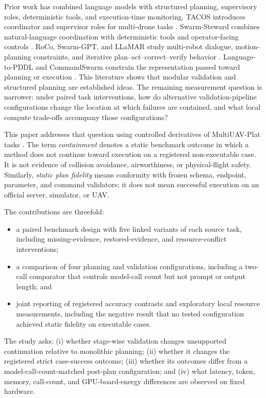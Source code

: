 \documentclass[conference]{IEEEtran}
\begin{document}
Prior work has combined language models with structured planning, supervisory
roles, deterministic tools, and execution-time monitoring. TACOS introduces
coordinator and supervisor roles for multi-drone tasks \cite{tacos}.
Swarm-Steward combines natural-language coordination with deterministic tools
and operator-facing controls \cite{swarm_steward}. RoCo, Swarm-GPT, and LLaMAR
study multi-robot dialogue, motion-planning constraints, and iterative
plan--act--correct--verify behavior \cite{roco,swarm_gpt,llamar}.
Language-to-PDDL and CommandSwarm constrain the representation passed toward
planning or execution \cite{language_pddl,commandswarm}. This literature shows
that modular validation and structured planning are established ideas. The
remaining measurement question is narrower: under paired task interventions,
how do alternative validation-pipeline configurations change the location at
which failures are contained, and what local compute trade-offs accompany
those configurations?

This paper addresses that question using controlled derivatives of
MultiUAV-Plat tasks \cite{multiuav_plat}. The term \emph{containment} denotes a
static benchmark outcome in which a method does not continue toward execution
on a registered non-executable case. It is not evidence of collision avoidance,
airworthiness, or physical-flight safety. Similarly, \emph{static plan
fidelity} means conformity with frozen schema, endpoint, parameter, and command
validators; it does not mean successful execution on an official server,
simulator, or UAV.

The contributions are threefold:
\begin{itemize}
  \item a paired benchmark design with five linked variants of each source task,
        including missing-evidence, restored-evidence, and resource-conflict
        interventions;
  \item a comparison of four planning and validation configurations, including
        a two-call comparator that controls model-call count but not prompt or
        output length; and
  \item joint reporting of registered accuracy contrasts and exploratory local
        resource measurements, including the negative result that no tested
        configuration achieved static fidelity on executable cases.
\end{itemize}

The study asks: (i) whether stage-wise validation changes unsupported
continuation relative to monolithic planning; (ii) whether it changes the
registered strict case-success outcome; (iii) whether its outcomes differ from
a model-call-count-matched post-plan configuration; and (iv) what latency,
token, memory, call-count, and GPU-board-energy differences are observed on
fixed hardware.
\end{document}
